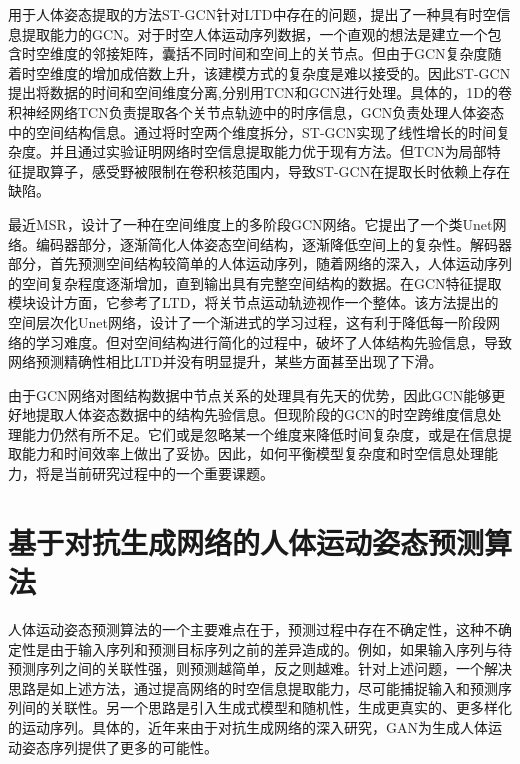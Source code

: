 用于人体姿态提取的方法ST-GCN\parencite{yan2018spatial}针对LTD中存在的问题，提出了一种具有时空信息提取能力的GCN。对于时空人体运动序列数据，一个直观的想法是建立一个包含时空维度的邻接矩阵，囊括不同时间和空间上的关节点。但由于GCN复杂度随着时空维度的增加成倍数上升，该建模方式的复杂度是难以接受的。因此ST-GCN提出将数据的时间和空间维度分离,分别用TCN\parencite{oord2016wavenet}和GCN进行处理。具体的，1D的卷积神经网络TCN负责提取各个关节点轨迹中的时序信息，GCN负责处理人体姿态中的空间结构信息。通过将时空两个维度拆分，ST-GCN实现了线性增长的时间复杂度。并且通过实验证明网络时空信息提取能力优于现有方法。但TCN为局部特征提取算子，感受野被限制在卷积核范围内，导致ST-GCN在提取长时依赖上存在缺陷。

最近MSR\parencite{dang2021msr}，设计了一种在空间维度上的多阶段GCN网络。它提出了一个类Unet\parencite{ronneberger2015u}网络。编码器部分，逐渐简化人体姿态空间结构，逐渐降低空间上的复杂性。解码器部分，首先预测空间结构较简单的人体运动序列，随着网络的深入，人体运动序列的空间复杂程度逐渐增加，直到输出具有完整空间结构的数据。在GCN特征提取模块设计方面，它参考了LTD，将关节点运动轨迹视作一个整体。该方法提出的空间层次化Unet网络，设计了一个渐进式的学习过程，这有利于降低每一阶段网络的学习难度。但对空间结构进行简化的过程中，破坏了人体结构先验信息，导致网络预测精确性相比LTD并没有明显提升，某些方面甚至出现了下滑。

由于GCN网络对图结构数据中节点关系的处理具有先天的优势，因此GCN能够更好地提取人体姿态数据中的结构先验信息。但现阶段的GCN的时空跨维度信息处理能力仍然有所不足。它们或是忽略某一个维度来降低时间复杂度，或是在信息提取能力和时间效率上做出了妥协。因此，如何平衡模型复杂度和时空信息处理能力，将是当前研究过程中的一个重要课题。

\section{基于对抗生成网络的人体运动姿态预测算法}
人体运动姿态预测算法的一个主要难点在于，预测过程中存在不确定性，这种不确定性是由于输入序列和预测目标序列之前的差异造成的。例如，如果输入序列与待预测序列之间的关联性强，则预测越简单，反之则越难。针对上述问题，一个解决思路是如上述方法，通过提高网络的时空信息提取能力，尽可能捕捉输入和预测序列间的关联性。另一个思路是引入生成式模型和随机性，生成更真实的、更多样化的运动序列。具体的，近年来由于对抗生成网络\parencite{goodfellow2020generative}的深入研究，GAN为生成人体运动姿态序列提供了更多的可能性。

